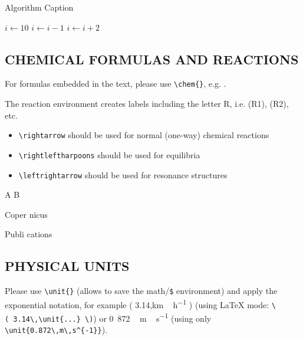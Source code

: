 \documentclass[ACP, manuscript]{copernicus}
\begin{document}
\begin{algorithm}
\caption{Algorithm Caption}
\label{a1}
\begin{algorithmic}
\STATE $i\gets 10$
        \STATE $i\gets i-1$
\ELSE
                \STATE $i\gets i+2$
        \ENDIF
\ENDIF
\end{algorithmic}
\end{algorithm}

\subsection{CHEMICAL FORMULAS AND REACTIONS}

For formulas embedded in the text, please use
\texttt{\textbackslash{}chem\{\}}, e.g. .

The reaction environment creates labels including the letter R, i.e.
(R1), (R2), etc.

\begin{itemize}
\item
  \texttt{\textbackslash{}rightarrow} should be used for normal
  (one-way) chemical reactions
\item
  \texttt{\textbackslash{}rightleftharpoons} should be used for
  equilibria
\item
  \texttt{\textbackslash{}leftrightarrow} should be used for resonance
  structures
\end{itemize}

\begin{reaction}
A \rightarrow B \\
\end{reaction}\begin{reaction}
Coper \rightleftharpoons nicus \\
\end{reaction}\begin{reaction}
Publi \leftrightarrow cations
\end{reaction}

\subsection{PHYSICAL UNITS}

Please use \texttt{\textbackslash{}unit\{\}} (allows to save the
math/\texttt{\$} environment) and apply the exponential notation, for
example ( 3.14,\unit{km\,h^{-1}} ) (using LaTeX mode:
\texttt{\textbackslash{}(\ 3.14\textbackslash{},\textbackslash{}unit\{...\}\ \textbackslash{})})
or \unit{0.872\,m\,s^{-1}} (using only
\texttt{\textbackslash{}unit\{0.872\textbackslash{},m\textbackslash{},s\^{}\{-1\}\}}).
\end{document}
